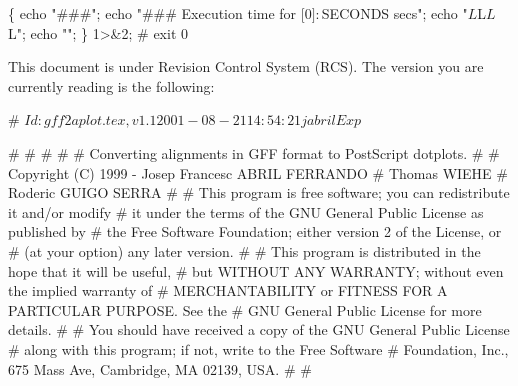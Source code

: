 \documentclass[11pt]{article}
\def\nwendcode{\endtrivlist \endgroup} %
\let\nwdocspar=\par                    %
\begin{document}
\nwenddocs{}\endmoddef
\{ echo "###"; echo "### Execution time for [$0] : $SECONDS secs";
  echo "$L$L$L$L";
  echo ""; \} 1>&2;
#
exit 0
\nwendcode{}\nwdocspar


This document is under Revision Control System (RCS). The version you are currently reading is the following:

\nwenddocs{}\endmoddef
# $Id: gff2aplot.tex,v 1.1 2001-08-21 14:54:21 jabril Exp $
\nwendcode{}\nwdocspar


\nwenddocs{}\endmoddef
# %
# %
# %
# 
#    Converting alignments in GFF format to PostScript dotplots.
# 
#     Copyright (C) 1999 - Josep Francesc ABRIL FERRANDO  
#                                  Thomas WIEHE                   
#                                 Roderic GUIGO SERRA       
#
# This program is free software; you can redistribute it and/or modify
# it under the terms of the GNU General Public License as published by
# the Free Software Foundation; either version 2 of the License, or
# (at your option) any later version.
# 
# This program is distributed in the hope that it will be useful,
# but WITHOUT ANY WARRANTY; without even the implied warranty of
# MERCHANTABILITY or FITNESS FOR A PARTICULAR PURPOSE.  See the
# GNU General Public License for more details.
# 
# You should have received a copy of the GNU General Public License
# along with this program; if not, write to the Free Software
# Foundation, Inc., 675 Mass Ave, Cambridge, MA 02139, USA.
# 
# %
\nwendcode{}\nwdocspar
\end{document}
